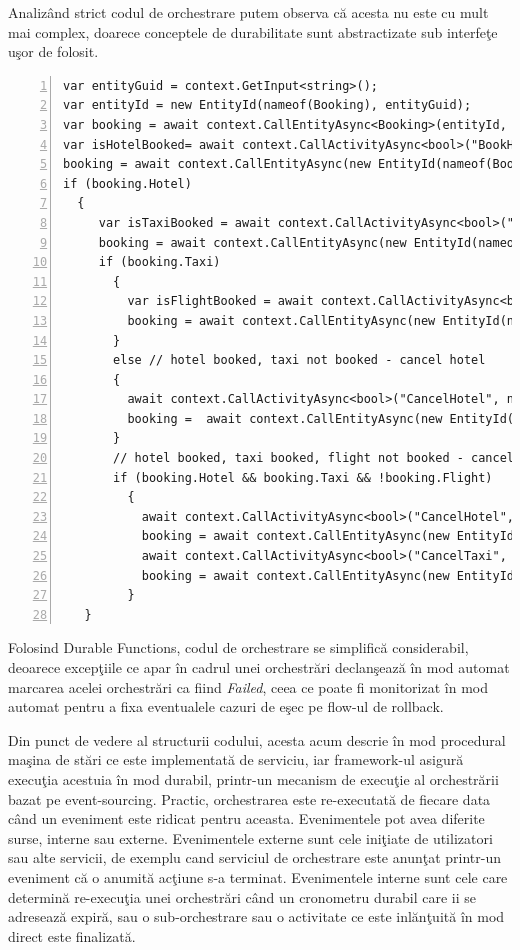 \documentclass[a4paper,12pt]{report}
\begin{document}
 \par Analizând strict codul de orchestrare putem observa că acesta nu este cu mult mai complex, doarece conceptele de durabilitate sunt abstractizate sub interfeţe uşor de folosit. 
\begin{lstlisting}[numbers=left]
var entityGuid = context.GetInput<string>();
var entityId = new EntityId(nameof(Booking), entityGuid);
var booking = await context.CallEntityAsync<Booking>(entityId, "Get");
var isHotelBooked= await context.CallActivityAsync<bool>("BookHotel", null);
booking = await context.CallEntityAsync(new EntityId(nameof(Booking), entityGuid),"UpdateHotel", isHotelBooked);
if (booking.Hotel)
  {
     var isTaxiBooked = await context.CallActivityAsync<bool>("BookTaxi", null);
     booking = await context.CallEntityAsync(new EntityId(nameof(Booking), entityGuid),"UpdateTaxi", isTaxiBooked);
     if (booking.Taxi)
       {
         var isFlightBooked = await context.CallActivityAsync<bool>("BookFlight", null);
         booking = await context.CallEntityAsync(new EntityId(nameof(Booking), entityGuid),"UpdateFlight", isFlightBooked);
       }
       else // hotel booked, taxi not booked - cancel hotel
       {
         await context.CallActivityAsync<bool>("CancelHotel", null);
         booking =  await context.CallEntityAsync(new EntityId(nameof(Booking), entityGuid),"UpdateHotel", false);
       }
       // hotel booked, taxi booked, flight not booked - cancel hotel & taxi
       if (booking.Hotel && booking.Taxi && !booking.Flight)
         {
           await context.CallActivityAsync<bool>("CancelHotel", null);
           booking = await context.CallEntityAsync(new EntityId(nameof(Booking), entityGuid),"UpdateHotel", false);
           await context.CallActivityAsync<bool>("CancelTaxi", null);
           booking = await context.CallEntityAsync(new EntityId(nameof(Booking), entityGuid),	"UpdateTaxi", false);
         }
   }
\end{lstlisting}
\par Folosind Durable Functions, codul de orchestrare se simplifică considerabil, deoarece excepţiile ce apar în cadrul unei orchestrări declanşează în mod automat marcarea acelei orchestrări ca fiind \emph{Failed}, ceea ce poate fi monitorizat în mod automat pentru a fixa eventualele cazuri de eşec pe flow-ul de rollback. 
\par Din punct de vedere al structurii codului, acesta acum descrie în mod procedural maşina de stări ce este implementată de serviciu, iar framework-ul asigură execuţia acestuia în mod durabil, printr-un mecanism de execuţie al orchestrării bazat pe event-sourcing. Practic, orchestrarea este re-executată de fiecare data când un eveniment este ridicat pentru aceasta. Evenimentele pot avea diferite surse, interne sau externe. Evenimentele externe sunt cele iniţiate de utilizatori sau alte servicii, de exemplu cand serviciul de orchestrare este anunţat printr-un eveniment că o anumită acţiune s-a terminat. Evenimentele interne sunt cele care determină re-execuţia unei orchestrări când un cronometru durabil care ii se adresează expiră, sau o sub-orchestrare sau o activitate ce este inlănţuită în mod direct este finalizată. 
\end{document}
